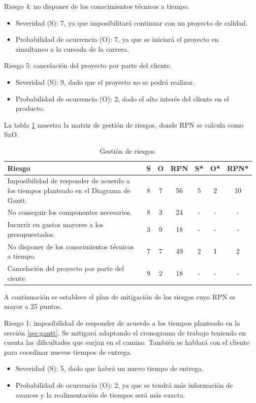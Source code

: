 \documentclass[
11pt, %
]{charter}
\begin{document}
Riesgo 4: no disponer de los conocimientos técnicos a tiempo.
\begin{itemize}
	\item Severidad (S): 7, ya que imposibilitará continuar con un proyecto de calidad.
	\item Probabilidad de ocurrencia (O): 7, ya que se iniciará el proyecto en simultaneo a la cursada de la carrera. 
\end{itemize}

Riesgo 5: cancelación del proyecto por parte del cliente.
\begin{itemize}
	\item Severidad (S): 9, dado que el proyecto no se podrá realizar.
	\item Probabilidad de ocurrencia (O): 2, dado el alto interés del cliente en el producto. 
\end{itemize}

La tabla \ref{tab:riesgos} muestra la matriz de gestión de riesgos, donde RPN se calcula como SxO.
\begin{table}[htpb]
\centering
\begin{tabularx}{\linewidth}{@{}|X|c|c|c|c|c|c|@{}}
\hline
\rowcolor[HTML]{C0C0C0} 
Riesgo & S & O & RPN & S* & O* & RPN* \\ \hline
Imposibilidad de responder de acuerdo a los tiempos planteado en el Diagrama de Gantt.&8&7&56&5&2&10\\ \hline
No conseguir los componentes necesarios.&8&3&24&-&-&-\\ \hline
Incurrir en gastos mayores a los presupuestados.&3&9&18&-&-&-\\ \hline
No disponer de los conocimientos técnicos a tiempo.&7&7&49&2&1&2\\ \hline
Cancelación del proyecto por parte del ciente.&9&2&18&-&-&-\\ \hline
\end{tabularx}%
\caption{Gestión de riesgos.}
\label{tab:riesgos}
\end{table}

A continuación se establece el plan de mitigación de los riesgos cuyo RPN es mayor a 25 puntos.

Riesgo 1: imposibilidad de responder de acuerdo a los tiempos planteado en la sección \ref{sec:gantt}. Se mitigará adaptando el cronograma de trabajo teniendo en cuenta las dificultades que surjan en el camino. También se hablará con el cliente para coordinar nuevos tiempos de entrega.
\begin{itemize}
	\item Severidad (S): 5, dado que habrá un nuevo tiempo de entrega.
	\item Probabilidad de ocurrencia (O): 2, ya que se tendrá más información de avances y la realimentación de tiempos será más exacta. 
\end{itemize}
\end{document}
